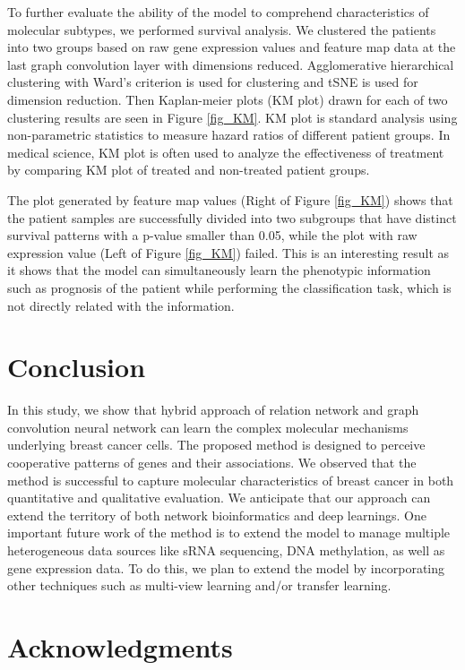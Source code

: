\documentclass{article}
\begin{document}
To further evaluate the ability of the model to comprehend characteristics of molecular subtypes, we performed survival analysis. 
We clustered the patients into two groups based on raw gene expression values and feature map data at the last graph convolution layer with dimensions reduced.
Agglomerative hierarchical clustering with Ward's criterion \cite{ward1963hierarchical} is used for clustering and tSNE is used for dimension reduction. Then Kaplan-meier plots (KM plot) \cite{kaplan1958nonparametric} drawn for each of two clustering results are seen in Figure \ref{fig_KM}. 
KM plot is standard analysis using non-parametric statistics to measure hazard ratios of different patient groups. In medical science, KM plot is often used to analyze the effectiveness of treatment by comparing KM plot of treated and non-treated patient groups.

The plot generated by feature map values (Right of Figure \ref{fig_KM}) shows that the patient samples are successfully divided into two subgroups that have distinct survival patterns with a p-value smaller than 0.05, while the plot with raw expression value (Left of Figure \ref{fig_KM}) failed. This is an interesting result as it shows that the model can simultaneously learn the phenotypic information such as prognosis of the patient while performing the classification task, which is not directly related with the information.


\section{Conclusion}
In this study, we show that hybrid approach of relation network and graph convolution neural network can learn the complex molecular mechanisms underlying breast cancer cells.
The proposed method is designed to perceive cooperative patterns of genes and their associations.
We observed that the method is successful to capture molecular characteristics of breast cancer in both quantitative and qualitative evaluation.
We anticipate that our approach can extend the territory of both network bioinformatics and deep learnings.
One important future work of the method is to extend the model to manage multiple heterogeneous data sources like sRNA sequencing, DNA methylation, as well as gene expression data. To do this, we plan to extend the model by incorporating other techniques such as multi-view learning and/or transfer learning.

\section*{Acknowledgments}
\end{document}
